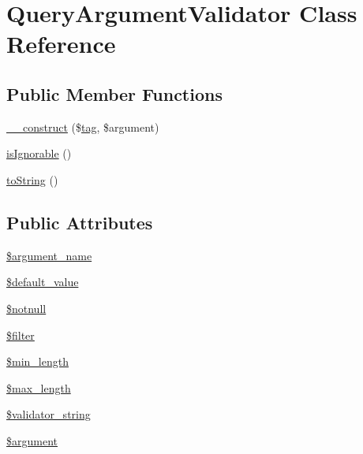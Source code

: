 \hypertarget{classQueryArgumentValidator}{\section{Query\-Argument\-Validator Class Reference}
\label{classQueryArgumentValidator}
}
\subsection*{Public Member Functions}
\begin{DoxyCompactItemize}
\item 
\hyperlink{classQueryArgumentValidator_a8b6124470ad9ab5bafe684e53f5f880d}{\-\_\-\-\_\-construct} (\$\hyperlink{classtag}{tag}, \$argument)
\item 
\hyperlink{classQueryArgumentValidator_a96a437a301285100d7bdc48efa281b67}{is\-Ignorable} ()
\item 
\hyperlink{classQueryArgumentValidator_ac3e647908a2711c1486fb8fe959e1ad0}{to\-String} ()
\end{DoxyCompactItemize}
\subsection*{Public Attributes}
\begin{DoxyCompactItemize}
\item 
\hyperlink{classQueryArgumentValidator_ab93f9d1c60306e24c8e13aebbb47e4d3}{\$argument\-\_\-name}
\item 
\hyperlink{classQueryArgumentValidator_ae61c68b0a9cd40caa31c464ffddf4ffa}{\$default\-\_\-value}
\item 
\hyperlink{classQueryArgumentValidator_a45e9ab83bacc4f0895f05faa3aeac81c}{\$notnull}
\item 
\hyperlink{classQueryArgumentValidator_a43b0653e37185f392daf500c50484186}{\$filter}
\item 
\hyperlink{classQueryArgumentValidator_a5553903c3bdf620408196db924a918c0}{\$min\-\_\-length}
\item 
\hyperlink{classQueryArgumentValidator_a6c99b1e774c49ebe4cbb5f8671156654}{\$max\-\_\-length}
\item 
\hyperlink{classQueryArgumentValidator_aa06a359be9617e979f903ae78537ad79}{\$validator\-\_\-string}
\item 
\hyperlink{classQueryArgumentValidator_ac2c4d055e1160de51ad214e8ed7d8f18}{\$argument}
\end{DoxyCompactItemize}


